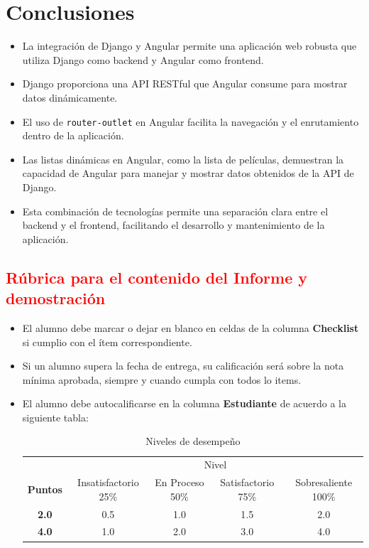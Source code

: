 \documentclass{article}
\begin{document}

  \section{Conclusiones}
  \begin{itemize}
    \item La integración de Django y Angular permite una aplicación web robusta que utiliza Django como backend 
    y Angular como frontend.
    \item Django proporciona una API RESTful que Angular consume para mostrar datos dinámicamente.
    \item El uso de \texttt{router-outlet} en Angular facilita la navegación y el enrutamiento dentro de la aplicación.
    \item Las listas dinámicas en Angular, como la lista de películas, demuestran la capacidad de Angular para manejar 
    y mostrar datos obtenidos de la API de Django.
    \item Esta combinación de tecnologías permite una separación clara entre el backend y el frontend, facilitando el 
    desarrollo y mantenimiento de la aplicación.
  \end{itemize}


	\newpage
	\subsection{\textcolor{red}{Rúbrica para el contenido del Informe y demostración}}
	\begin{itemize}			
		\item El alumno debe marcar o dejar en blanco en celdas de la columna \textbf{Checklist} si cumplio con el ítem correspondiente.
		\item Si un alumno supera la fecha de entrega,  su calificación será sobre la nota mínima aprobada, siempre y cuando cumpla con todos lo items.
		\item El alumno debe autocalificarse en la columna \textbf{Estudiante} de acuerdo a la siguiente tabla:
	
		\begin{table}[ht]
			\caption{Niveles de desempeño}
			\begin{center}
			\begin{tabular}{ccccc}
    			\hline
    			 & \multicolumn{4}{c}{Nivel}\\
    			\cline{1-5}
    			\textbf{Puntos} & Insatisfactorio 25\%& En Proceso 50\% & Satisfactorio 75\% & Sobresaliente 100\%\\
    			\textbf{2.0}&0.5&1.0&1.5&2.0\\
    			\textbf{4.0}&1.0&2.0&3.0&4.0\\
    		\hline
			\end{tabular}
		\end{center}
	\end{table}	
	

	\end{itemize}
\end{document}
